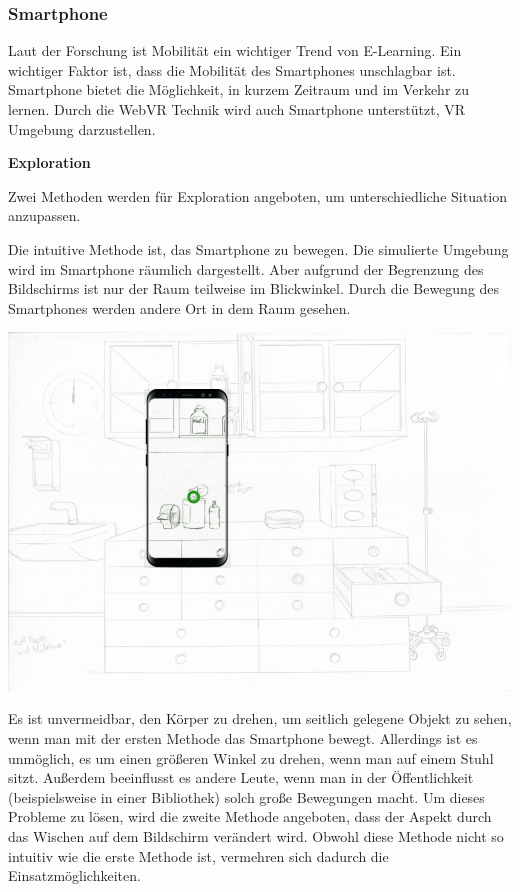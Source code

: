 \subsubsection{Smartphone}
 Laut der Forschung ist Mobilität ein wichtiger Trend von E-Learning. Ein wichtiger Faktor ist, dass die Mobilität des Smartphones unschlagbar ist. Smartphone bietet die Möglichkeit, in kurzem Zeitraum und im Verkehr zu lernen. Durch die WebVR Technik wird auch Smartphone unterstützt, VR Umgebung darzustellen.
 
  \textbf{Exploration}
  
  Zwei Methoden werden für Exploration angeboten, um unterschiedliche Situation anzupassen.
  
  Die intuitive Methode ist, das Smartphone zu bewegen. Die simulierte Umgebung wird im Smartphone räumlich dargestellt. Aber aufgrund der Begrenzung des Bildschirms ist nur der Raum teilweise im Blickwinkel. Durch die Bewegung des Smartphones werden andere Ort in dem Raum gesehen.

  \includegraphics[width=\textwidth]{images/paperPrototypewiths8mini.png}
  
  Es ist unvermeidbar, den Körper zu drehen, um seitlich gelegene Objekt zu sehen, wenn man mit der ersten Methode das Smartphone bewegt. Allerdings ist es unmöglich, es um einen größeren Winkel zu drehen, wenn man auf einem Stuhl sitzt. Außerdem beeinflusst es andere Leute, wenn man in der Öffentlichkeit (beispielsweise in einer Bibliothek) solch große Bewegungen macht. Um dieses Probleme zu lösen, wird die zweite Methode angeboten, dass der Aspekt durch das Wischen auf dem Bildschirm verändert wird. Obwohl diese Methode nicht so intuitiv wie die erste Methode ist, vermehren sich dadurch die Einsatzmöglichkeiten.
  
